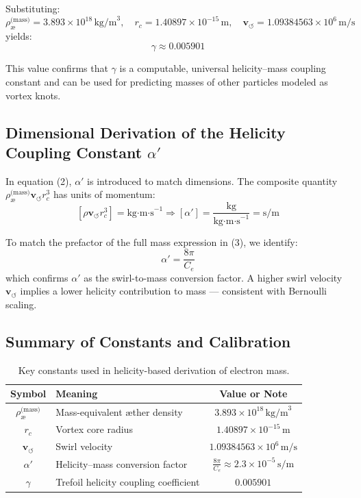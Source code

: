\documentclass[12pt]{article}
\begin{document}
Substituting:
\[
\rho_\text{\ae}^{\text{(mass)}} = 3.893 \times 10^{18} \, \text{kg/m}^3, \quad
r_c = 1.40897 \times 10^{-15} \, \text{m}, \quad
\mathbf{v}_{\scriptscriptstyle\boldsymbol{\circlearrowleft}} = 1.09384563 \times 10^6 \, \text{m/s}
\]
yields:
\[
\boxed{\gamma \approx 0.005901}
\]

This value confirms that \( \gamma \) is a computable, universal helicity–mass coupling constant and can be used for predicting masses of other particles modeled as vortex knots.

\subsection*{Dimensional Derivation of the Helicity Coupling Constant \( \alpha' \)}

In equation (2), \( \alpha' \) is introduced to match dimensions. The composite quantity \( \rho_\text{\ae}^{\text{(mass)}} \mathbf{v}_{\scriptscriptstyle\boldsymbol{\circlearrowleft}} r_c^3 \) has units of momentum:
\[
[\rho \mathbf{v}_{\scriptscriptstyle\boldsymbol{\circlearrowleft}} r_c^3] = \text{kg·m·s}^{-1}
\Rightarrow
[\alpha'] = \frac{\text{kg}}{\text{kg·m·s}^{-1}} = \text{s/m}
\]

To match the prefactor of the full mass expression in (3), we identify:
\[
\boxed{\alpha' = \frac{8\pi}{C_e}}
\]
which confirms \( \alpha' \) as the swirl-to-mass conversion factor. A higher swirl velocity \( \mathbf{v}_{\scriptscriptstyle\boldsymbol{\circlearrowleft}} \) implies a lower helicity contribution to mass — consistent with Bernoulli scaling.

\subsection*{Summary of Constants and Calibration}

\begin{table}[H]
\centering
\footnotesize
\renewcommand{\arraystretch}{1.4}
\begin{tabular}{|c|l|c|}
\hline
\textbf{Symbol} & \textbf{Meaning} & \textbf{Value or Note} \\
\hline
\( \rho_\text{\ae}^{\text{(mass)}} \) & Mass-equivalent æther density & \( 3.893 \times 10^{18} \, \text{kg/m}^3 \) \\
\( r_c \) & Vortex core radius & \( 1.40897 \times 10^{-15} \, \text{m} \) \\
\( \mathbf{v}_{\scriptscriptstyle\boldsymbol{\circlearrowleft}} \) & Swirl velocity & \( 1.09384563 \times 10^6 \, \text{m/s} \) \\
\( \alpha' \) & Helicity–mass conversion factor & \( \frac{8\pi}{C_e} \approx 2.3 \times 10^{-5} \, \text{s/m} \) \\
\( \gamma \) & Trefoil helicity coupling coefficient & \( \boxed{0.005901} \) \\
\hline
\end{tabular}
\caption{Key constants used in helicity-based derivation of electron mass.}
\end{table}
\end{document}
